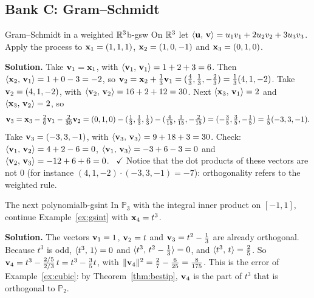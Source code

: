 \documentclass[11pt]{article}
\begin{document}
\subsection*{Bank C: Gram--Schmidt}
\begin{exmp}{Gram--Schmidt in a weighted $\mathbb{R}^3$}{b-gsw}
On $\mathbb{R}^3$ let $\langle \mathbf{u},\,\mathbf{v}\rangle=u_1v_1+2u_2v_2+3u_3v_3$. Apply the process to $\mathbf{x}_1=(1,1,1)$, $\mathbf{x}_2=(1,0,-1)$ and $\mathbf{x}_3=(0,1,0)$.

\textbf{Solution.} Take $\mathbf{v}_1=\mathbf{x}_1$, with $\langle \mathbf{v}_1,\,\mathbf{v}_1\rangle=1+2+3=6$. Then $\langle \mathbf{x}_2,\,\mathbf{v}_1\rangle=1+0-3=-2$, so $\mathbf{v}_2=\mathbf{x}_2+\tfrac13\mathbf{v}_1=(\tfrac43,\tfrac13,-\tfrac23)=\tfrac13(4,1,-2)$. Take $\mathbf{v}_2=(4,1,-2)$, with $\langle \mathbf{v}_2,\,\mathbf{v}_2\rangle=16+2+12=30$. Next $\langle \mathbf{x}_3,\,\mathbf{v}_1\rangle=2$ and $\langle \mathbf{x}_3,\,\mathbf{v}_2\rangle=2$, so
\[
\mathbf{v}_3=\mathbf{x}_3-\tfrac26\mathbf{v}_1-\tfrac2{30}\mathbf{v}_2=(0,1,0)-(\tfrac13,\tfrac13,\tfrac13)-(\tfrac4{15},\tfrac1{15},-\tfrac2{15})=(-\tfrac35,\tfrac35,-\tfrac15)=\tfrac15(-3,3,-1).
\]
Take $\mathbf{v}_3=(-3,3,-1)$, with $\langle \mathbf{v}_3,\,\mathbf{v}_3\rangle=9+18+3=30$. Check: $\langle \mathbf{v}_1,\,\mathbf{v}_2\rangle=4+2-6=0$, $\langle \mathbf{v}_1,\,\mathbf{v}_3\rangle=-3+6-3=0$ and $\langle \mathbf{v}_2,\,\mathbf{v}_3\rangle=-12+6+6=0$. \ $\checkmark$ Notice that the dot products of these vectors are not $0$ (for instance $(4,1,-2)\cdot(-3,3,-1)=-7$): orthogonality refers to the weighted rule.
\end{exmp}

\begin{exmp}{The next polynomial}{b-gsint}
In $\mathbb{P}_3$ with the integral inner product on $[-1,1]$, continue Example~\ref{ex:gsint} with $\mathbf{x}_4=t^3$.

\textbf{Solution.} The vectors $\mathbf{v}_1=1$, $\mathbf{v}_2=t$ and $\mathbf{v}_3=t^2-\tfrac13$ are already orthogonal. Because $t^3$ is odd, $\langle t^3,\,1\rangle=0$ and $\langle t^3,\,t^2-\tfrac13\rangle=0$, and $\langle t^3,\,t\rangle=\tfrac25$. So $\mathbf{v}_4=t^3-\tfrac{2/5}{2/3}\,t=t^3-\tfrac35t$, with $\lVert\mathbf{v}_4\rVert^2=\tfrac27-\tfrac6{25}=\tfrac8{175}$. This is the error of Example~\ref{ex:cubic}: by Theorem~\ref{thm:bestip}, $\mathbf{v}_4$ is the part of $t^3$ that is orthogonal to $\mathbb{P}_2$.
\end{exmp}
\end{document}
